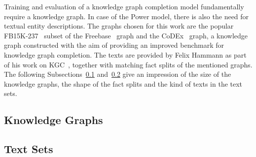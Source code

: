 Training and evaluation of a knowledge graph completion model fundamentally require a knowledge graph. In case of the Power model, there is also the need for textual entity descriptions. The graphs chosen for this work are the popular FB15K-237~\cite{Toutanova2015ObservedVL} subset of the  Freebase~\cite{Bollacker2008FreebaseAC} graph and the CoDEx~\cite{Safavi2020CoDExAC} graph, a knowledge graph constructed with the aim of providing an improved benchmark for knowledge graph completion. The texts are provided by Felix Hammann as part of his work on KGC~\cite{}, together with matching fact splits of the mentioned graphs. The following Subsections~\ref{subsec:5_experiments/1_data_sources/1_knowledge_graphs} and~\ref{subsec:5_experiments/1_data_sources/2_text_sets} give an impression of the size of the knowledge graphs, the shape of the fact splits and the kind of texts in the text sets.

\subsection{Knowledge Graphs}
\label{subsec:5_experiments/1_data_sources/1_knowledge_graphs}


\subsection{Text Sets}
\label{subsec:5_experiments/1_data_sources/2_text_sets}

